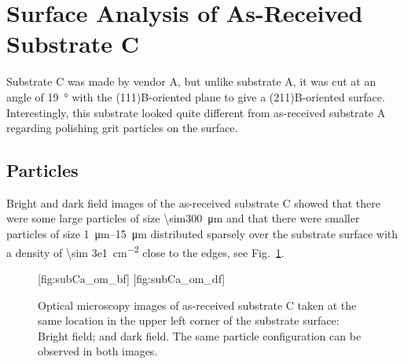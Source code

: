 \clearpage
\section{Surface Analysis of As-Received Substrate C}\label{sec:subCa}
Substrate C was made by vendor A, but unlike substrate A, it was cut at an angle of \SI{19}{\degree} with the (111)B-oriented plane to give a (211)B-oriented surface. Interestingly, this substrate looked quite different from as-received substrate A regarding polishing grit particles on the surface.

\subsection{Particles}
Bright and dark field images of the as-received substrate C showed that there were some large particles of size \SI{\sim300}{\micro\metre} and that there were smaller particles of size \SIrange{1}{15}{\micro\metre} distributed sparsely over the substrate surface with a density of \SI{\sim 3e1}{\centi\metre^{-2}} close to the edges, see Fig.~\ref{fig:subCa_om}. %

\begin{figure}[htbp]
    \centering
    [fig:subCa_om_bf]
    \hfill
    [fig:subCa_om_df]
    \caption[Bright and dark field optical microscopy images of as-received substrate C.]{Optical microscopy images of as-received substrate C taken at the same location in the upper left corner of the substrate surface:  Bright field; and  dark field. The same particle configuration can be observed in both images.}
    \label{fig:subCa_om}
\end{figure}

